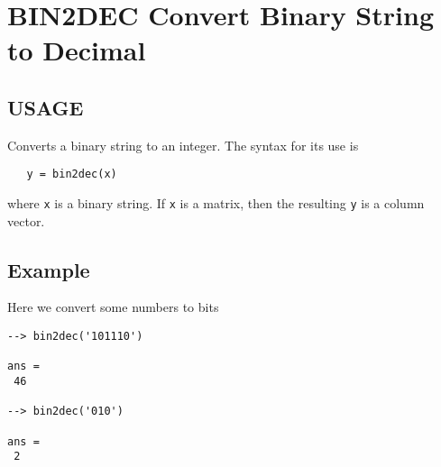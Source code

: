 \section{BIN2DEC Convert Binary String to Decimal}

\subsection{USAGE}

Converts a binary string to an integer.  The syntax for its
use is
\begin{verbatim}
   y = bin2dec(x)
\end{verbatim}
where \verb|x| is a binary string. If \verb|x| is a matrix, then the resulting 
\verb|y| is a column vector.
\subsection{Example}

Here we convert some numbers to bits
\begin{verbatim}
--> bin2dec('101110')

ans = 
 46 

--> bin2dec('010')

ans = 
 2 
\end{verbatim}
